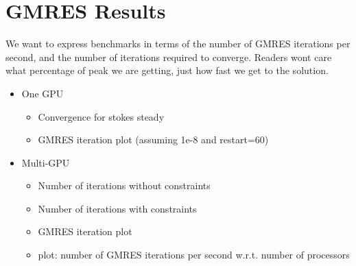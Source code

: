 \section{GMRES Results}

We want to express benchmarks in terms of the number of GMRES iterations per second, and the number of iterations required to converge. Readers wont care what percentage of peak we are getting, just how fast we get to the solution. 

\begin{itemize} 
\item One GPU
\begin{itemize} 
	\item {\color{blue} Convergence for stokes steady}  
	\item {\color{blue} GMRES iteration plot (assuming 1e-8 and restart=60)} 
\end{itemize} 
\item Multi-GPU
	\begin{itemize} 
		\item Number of iterations without constraints
		\item Number of iterations with constraints
		\item GMRES iteration plot
		\item plot: number of GMRES iterations per second w.r.t. number of processors
	\end{itemize} 
\end{itemize} 


%


